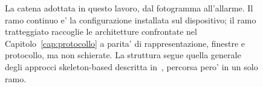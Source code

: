 \begin{figure}[htbp]

\caption{La catena adottata in questo lavoro, dal fotogramma all'allarme. Il
ramo continuo e' la configurazione installata sul dispositivo; il ramo
tratteggiato raccoglie le architetture confrontate nel
Capitolo~\ref{cap:protocollo} a parita' di rappresentazione, finestre e
protocollo, ma non schierate. La struttura segue quella generale degli
approcci skeleton-based descritta in~\cite{HO}, percorsa pero' in un solo
ramo.}
\label{fig:pipeline}
\end{figure}
